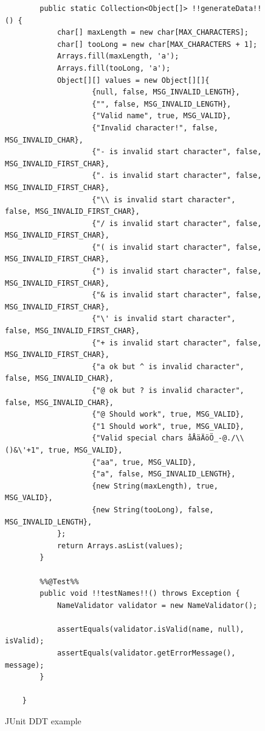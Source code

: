 \begin{figure}[H]
\begin{lstlisting}[style=javatiny]
        %%@Parameters%%(name = "{index}: name: \"{0}\"")
        public static Collection<Object[]> !!generateData!!() {
            char[] maxLength = new char[MAX_CHARACTERS];
            char[] tooLong = new char[MAX_CHARACTERS + 1];
            Arrays.fill(maxLength, 'a');
            Arrays.fill(tooLong, 'a');
            Object[][] values = new Object[][]{
                    {null, false, MSG_INVALID_LENGTH},
                    {"", false, MSG_INVALID_LENGTH},
                    {"Valid name", true, MSG_VALID},
                    {"Invalid character!", false, MSG_INVALID_CHAR},
                    {"- is invalid start character", false, MSG_INVALID_FIRST_CHAR},
                    {". is invalid start character", false, MSG_INVALID_FIRST_CHAR},
                    {"\\ is invalid start character", false, MSG_INVALID_FIRST_CHAR},
                    {"/ is invalid start character", false, MSG_INVALID_FIRST_CHAR},
                    {"( is invalid start character", false, MSG_INVALID_FIRST_CHAR},
                    {") is invalid start character", false, MSG_INVALID_FIRST_CHAR},
                    {"& is invalid start character", false, MSG_INVALID_FIRST_CHAR},
                    {"\' is invalid start character", false, MSG_INVALID_FIRST_CHAR},
                    {"+ is invalid start character", false, MSG_INVALID_FIRST_CHAR},
                    {"a ok but ^ is invalid character", false, MSG_INVALID_CHAR},
                    {"@ ok but ? is invalid character", false, MSG_INVALID_CHAR},
                    {"@ Should work", true, MSG_VALID},
                    {"1 Should work", true, MSG_VALID},
                    {"Valid special chars åÅäÄöÖ_-@./\\()&\'+1", true, MSG_VALID},
                    {"aa", true, MSG_VALID},
                    {"a", false, MSG_INVALID_LENGTH},
                    {new String(maxLength), true, MSG_VALID},
                    {new String(tooLong), false, MSG_INVALID_LENGTH},
            };
            return Arrays.asList(values);
        }

        %%@Test%%
        public void !!testNames!!() throws Exception {
            NameValidator validator = new NameValidator();

            assertEquals(validator.isValid(name, null), isValid);
            assertEquals(validator.getErrorMessage(), message);
        }

    }
        \end{lstlisting}
        \caption{JUnit DDT example}
        \label{fig:junit-bit-example}
    \end{figure}

